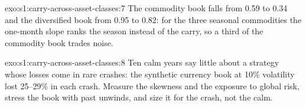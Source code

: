 \begin{solution}{exo:s1:carry-across-asset-classes:7}
The commodity book falls from 0.59 to 0.34 and the diversified book from 0.95 to 0.82: for the three seasonal commodities the one-month slope ranks the
season instead of the carry, so a third of the commodity book trades noise.
\end{solution}

\begin{solution}{exo:s1:carry-across-asset-classes:8}
Ten calm years say little about a strategy whose losses come in rare crashes: the synthetic currency book at 10\% volatility lost 25--29\% in each
crash. Measure the skewness and the exposure to global risk, stress the book with past unwinds, and size it for the crash, not the calm.
\end{solution}

